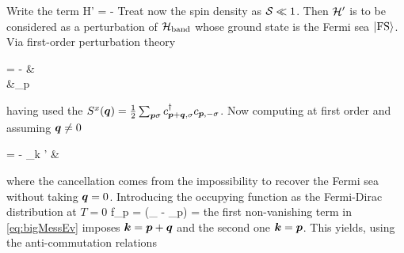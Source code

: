 		Write the term
		\be \mc H' = -  \ee
		Treat now the spin density as $\mathcal S\ll 1$. Then $\mathcal H'$ is to be considered as a perturbation of $\mathcal H_\text{band}$ whose ground state is the Fermi sea $\ket{\text{FS}}$. Via first-order perturbation theory
		\be \begin{split} \ket \psi =  - & \\ &\cdot \sum_{\vb* p \sigma}   \end{split} \ee
		having used the $S^x(\vb* q) = \frac{1}{2} \sum_{\vb* p \sigma} c^\dagger_{\vb* p + \vb* q, \sigma} c_{\vb* p, -\sigma}$. Now computing at first order and assuming $\vb* q \neq 0$
		\be \begin{split}  = - \sum_{\vb* k \sigma'}  &  \end{split} \label{eq:bigMessEv} \ee
		where the cancellation comes from the impossibility to recover the Fermi sea without taking $\vb* q=0$. Introducing the occupying function as the Fermi-Dirac distribution at $T=0$
		\be f_{\vb* p} = \Theta (\varepsilon_ - \varepsilon_{\vb* p}) =  \ee
		the first non-vanishing term in \eqref{eq:bigMessEv} imposes $\vb* k = \vb* p + \vb* q$ and the second one $\vb* k = \vb* p$. This yields, using the anti-commutation relations
